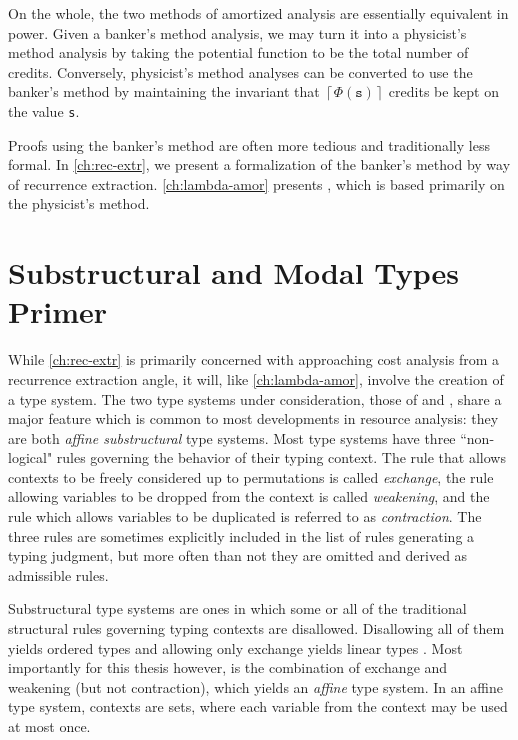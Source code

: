 On the whole, the two methods of amortized analysis are essentially equivalent in power. Given a banker's method analysis, we may turn it into a physicist's method analysis by taking the potential function to be the total number of credits. Conversely, physicist's method analyses can be converted to use the banker's method by maintaining the invariant that $ \left\lceil{\Phi(\texttt{s})}\right \rceil$ credits be kept on the value \texttt{s}.

Proofs using the banker's method are often more tedious and traditionally less formal. In \autoref{ch:rec-extr}, we present a formalization of the banker's method by way of recurrence extraction. \autoref{ch:lambda-amor} presents \lambdaamor, which is based primarily on the physicist's method.

\section{Substructural and Modal Types Primer}
\label{sec:modal-and-substructural}
While \autoref{ch:rec-extr} is primarily concerned with approaching cost analysis from a recurrence extraction angle, it will, like \autoref{ch:lambda-amor}, involve the creation of a type system. The two type systems under consideration, those of \lambdaA and \lambdaamor, share a major feature which is common to most developments in resource analysis: they are both \textit{affine substructural} type systems. Most type systems have three ``non-logical" rules governing the behavior of their typing context. The rule that allows contexts to be freely considered up to permutations is called \textit{exchange}, the rule allowing variables to be dropped from the context is called \textit{weakening}, and the rule which allows variables to be duplicated is referred to as \textit{contraction}. The three rules are sometimes explicitly included in the list of rules generating a typing judgment, but more often than not they are omitted and derived as admissible rules.

Substructural type systems are ones in which some or all of the traditional structural rules governing typing contexts are disallowed. Disallowing all of them yields ordered types \citehere and allowing only exchange yields linear types \citehere. Most importantly for this thesis however, is the combination of exchange and weakening (but not contraction), which yields an \textit{affine} type system. In an affine type system, contexts are sets, where each variable from the context may be used at most once.

